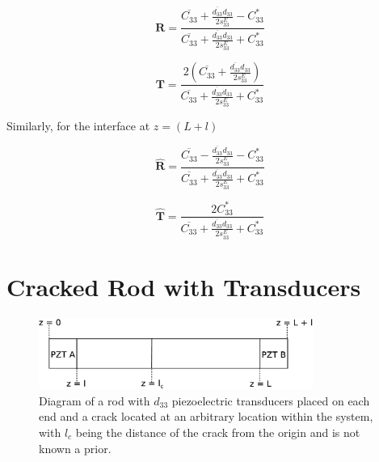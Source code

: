 \begin{equation}
\boldsymbol{R} = \frac{\overline{C_{33}} + \frac{\overline{d_{33}}d_{33}}{2s^E_{33}} - C^*_{33}}{\overline{C_{33}} + \frac{\overline{d_{33}}d_{33}}{2s^E_{33}} + C^*_{33}}
\end{equation}

\begin{equation}
\boldsymbol{T} = \frac{2(\overline{C_{33}} + \frac{\overline{d_{33}}d_{33}}{2s^E_{33}})}{\overline{C_{33}} + \frac{\overline{d_{33}}d_{33}}{2s^E_{33}} + C^*_{33}}
\end{equation}


Similarly, for the interface at $z = (L + l)$

\begin{equation}
\boldsymbol{\hat{R}} = \frac{\overline{C_{33}} - \frac{\overline{d_{33}}d_{33}}{2s^E_{33}} - C^*_{33}}{\overline{C_{33}} + \frac{\overline{d_{33}}d_{33}}{2s^E_{33}} + C^*_{33}}
\end{equation}

\begin{equation}
\boldsymbol{\hat{T}} = \frac{2C^*_{33}}{\overline{C_{33}} + \frac{\overline{d_{33}}d_{33}}{2s^E_{33}} + C^*_{33}}
\end{equation}


\section{Cracked Rod with Transducers}
\label{sec:rodTransCrack}

\begin{figure}[ht!]
\centering
\includegraphics[width=0.8\textwidth]{eps_pics/rodTransCrack.eps}
\caption{Diagram of a rod with $d_{33}$ piezoelectric transducers placed on each end and a crack located at an arbitrary location within the system, with $l_c$ being the distance of the crack from the origin and is not known a prior.
	 \label{fig:rodTransCrack}} 
\end{figure}


